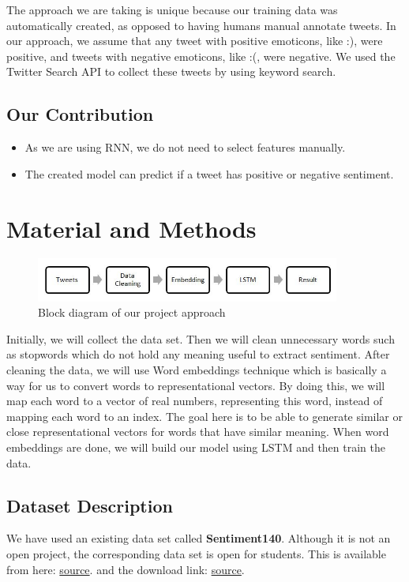 \documentclass{article}
\begin{document}
The approach we are taking is unique because our training data was automatically created, as opposed to having humans manual annotate tweets. In our approach, we assume that any tweet with positive emoticons, like :), were positive, and tweets with negative emoticons, like :(, were negative. We used the Twitter Search API to collect these tweets by using keyword search.

\subsection{Our Contribution}
\begin{itemize}
  \item As we are using RNN, we do not need to select features manually.
  \item The created model can predict if a tweet has positive or negative sentiment.
\end{itemize}

\section{Material and Methods}
\begin{figure}[htp]
    \centering
    \includegraphics[width=10cm]{lstm.JPG}
    \caption{Block diagram of our project approach}
    \label{fig:galaxy}
\end{figure}
Initially, we will collect the data set. Then we will clean unnecessary words such as stopwords which do not hold any meaning useful to extract sentiment. After cleaning the data, we will use Word embeddings technique which is basically a way for us to convert words to representational vectors. By doing this, we will map each word to a vector of real numbers, representing this word, instead of mapping each word to an index. The goal here is to be able to generate similar or close representational vectors for words that have similar meaning. When word embeddings are done, we will build our model using LSTM and then train the data.

\subsection{Dataset Description}
We have used an existing data set called \textbf{Sentiment140}. Although it is not an open project, the corresponding data set is open for students. This is available from here:  \href{http://help.sentiment140.com/for-students/}{source}. and the download link: \href{http://cs.stanford.edu/people/alecmgo/trainingandtestdata.zip}{source}.
\end{document}
